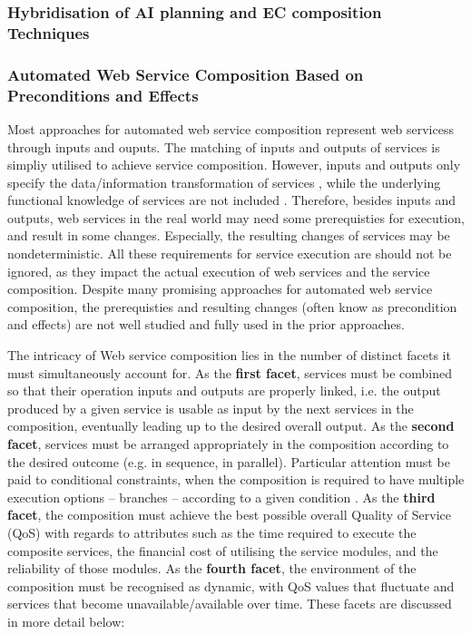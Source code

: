 \subsubsection{Hybridisation of AI planning and EC composition Techniques}





\subsubsection{Automated Web Service Composition Based on Preconditions and Effects}

Most approaches for automated web service composition represent web servicess through inputs and ouputs. The matching of inputs and outputs of services is simpliy utilised to achieve service composition. However, inputs and outputs only specify the data/information transformation of services \cite{martin2004owl}, while the underlying functional knowledge of services are not included \cite{paliwal2012semantics}. Therefore, besides inputs and outputs, web services in the real world may need some prerequisties for execution, and result in some changes. Especially, the resulting changes of services may be nondeterministic. All these requirements for service execution are should not be ignored, as they impact the actual execution of web services and the service composition. Despite many promising approaches for automated web service composition, the prerequisties and resulting changes (often know as precondition and effects) are not well studied and fully used in the prior approaches. 






The intricacy of Web service composition lies in the number of distinct facets it must simultaneously account for. As the \textbf{first facet}, services must be combined so that their operation inputs and outputs are properly linked, i.e. the output produced by a given service is usable as input by the next services in the composition, eventually leading up to the desired overall output. As the \textbf{second facet}, services must be arranged appropriately in the composition according to the desired outcome (e.g. in sequence, in parallel). Particular attention must be paid to conditional constraints, when the composition is required to have multiple execution options -- branches -- according to a given condition \cite{wang2014automated,sohrabi2009web,karakoc2009composing}. As the \textbf{third facet}, the composition must achieve the best possible overall Quality of Service (QoS) with regards to attributes such as the time required to execute the composite services, the financial cost of utilising the service modules, and the reliability of those modules. As the \textbf{fourth facet}, the environment of the composition must be recognised as dynamic, with QoS values that fluctuate and services that become unavailable/available over time. These facets are discussed in more detail below:

